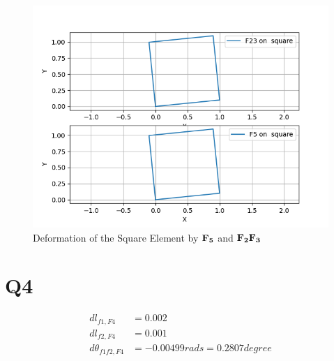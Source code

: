 \documentclass[a4paper,12pt]{article} %
\begin{document}
    \begin{figure}[htbp]
        \center
        \includegraphics[scale=0.6]{HW2Q3_2.png}
        \caption{Deformation of the Square Element by $\mathbf{F_5}$ and $\mathbf{F_2F_3}$}
    \end{figure}

\newpage
\section*{Q4}
\begin{align*}
dl_{f1,F4} &= 0.002\\
dl_{f2,F4} &= 0.001\\
d\theta_{f1f2,F4} &= -0.00499 rads  = 0.2807 degree\\
\end{align*}
\end{document}
